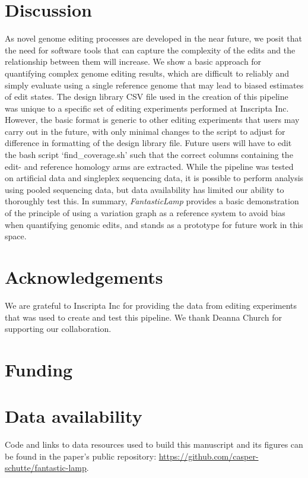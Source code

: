 \documentclass{bioinfo}
\theoremstyle{definition}
\begin{document}
\section{Discussion}
\label{sec:discussion}
As novel genome editing processes are developed in the near future, we posit that the need for software tools that can capture the complexity of the edits and the relationship between them will increase.
We show a basic approach for quantifying complex genome editing results, which are difficult to reliably and simply evaluate using a single reference genome that may lead to biased estimates of edit states.
The design library CSV file used in the creation of this pipeline was unique to a specific set of editing experiments performed at Inscripta Inc.
However, the basic format is generic to other editing experiments that users may carry out in the future, with only minimal changes to the script to adjust for difference in formatting of the design library file.
Future users will have to edit the bash script `find\_coverage.sh' such that the correct columns containing the edit- and reference homology arms are extracted.
While the pipeline was tested on artificial data and singleplex sequencing data, it is possible to perform analysis using pooled sequencing data, but data availability has limited our ability to thoroughly test this.
In summary, \textit{FantasticLamp} provides a basic demonstration of the principle of using a variation graph as a reference system to avoid bias when quantifying genomic edits, and stands as a prototype for future work in this space.
\section*{Acknowledgements}
We are grateful to Inscripta Inc for providing the data from editing experiments that was used to create and test this pipeline. We thank Deanna Church for supporting our collaboration.

\section*{Funding}

\section*{Data availability}
Code and links to data resources used to build this manuscript and its figures can be found in the paper's public repository: \url{https://github.com/casper-schutte/fantastic-lamp}.




\end{document}
